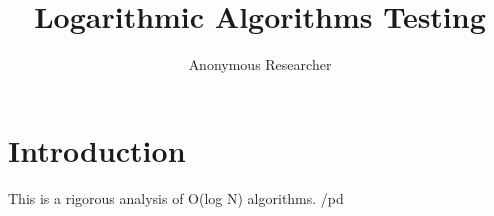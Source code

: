 \documentclass[10pt,journal,compsoc]{IEEEtran}
\begin{document}
\title{Logarithmic Algorithms Testing}

\author{ Anonymous Researcher }


\maketitle
\IEEEdisplaynontitleabstractindextext
\IEEEpeerreviewmaketitle

\section{Introduction}
This is a rigorous analysis of O(log N) algorithms. /pd
\end{document}
